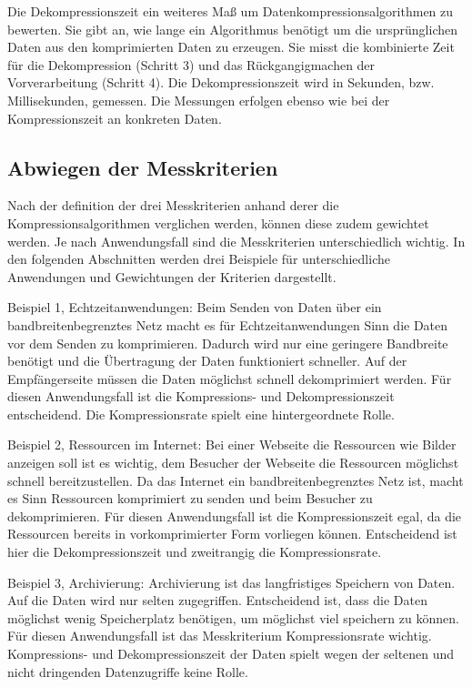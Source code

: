 \documentclass[conference]{IEEEtran}
\begin{document}
Die Dekompressionszeit ein weiteres Maß um Datenkompressionsalgorithmen zu bewerten.
Sie gibt an, wie lange ein Algorithmus benötigt um
die ursprünglichen Daten aus den komprimierten Daten zu erzeugen.
Sie misst die kombinierte Zeit für die Dekompression (Schritt 3) und das
Rückgangigmachen der Vorverarbeitung (Schritt 4).
Die Dekompressionszeit wird in Sekunden, bzw. Millisekunden, gemessen.
Die Messungen erfolgen ebenso wie bei der Kompressionszeit an konkreten Daten.

\subsection{Abwiegen der Messkriterien}

Nach der definition der drei Messkriterien anhand derer die
Kompressionsalgorithmen verglichen werden, können diese zudem gewichtet
werden.
Je nach Anwendungsfall sind die Messkriterien unterschiedlich wichtig.
In den folgenden Abschnitten werden drei Beispiele für unterschiedliche
Anwendungen und Gewichtungen der Kriterien dargestellt.

Beispiel 1, Echtzeitanwendungen:
Beim Senden von Daten über ein bandbreitenbegrenztes Netz macht es für
Echtzeitanwendungen Sinn die Daten vor dem Senden zu komprimieren.
Dadurch wird nur eine geringere Bandbreite benötigt und die Übertragung der
Daten funktioniert schneller.
Auf der Empfängerseite müssen die Daten möglichst schnell dekomprimiert werden.
Für diesen Anwendungsfall ist die Kompressions- und Dekompressionszeit entscheidend.
Die Kompressionsrate spielt eine hintergeordnete Rolle.

Beispiel 2, Ressourcen im Internet:
Bei einer Webseite die Ressourcen wie Bilder anzeigen soll ist es wichtig,
dem Besucher der Webseite die Ressourcen möglichst schnell bereitzustellen.
Da das Internet ein bandbreitenbegrenztes Netz ist, macht es Sinn Ressourcen komprimiert
zu senden und beim Besucher zu dekomprimieren.
Für diesen Anwendungsfall ist die Kompressionszeit egal, da die Ressourcen
bereits in vorkomprimierter Form vorliegen können.
Entscheidend ist hier die Dekompressionszeit und zweitrangig die Kompressionsrate.

Beispiel 3, Archivierung:
Archivierung ist das langfristiges Speichern von Daten.
Auf die Daten wird nur selten zugegriffen.
Entscheidend ist, dass die Daten möglichst wenig Speicherplatz benötigen,
um möglichst viel speichern zu können.
Für diesen Anwendungsfall ist das Messkriterium Kompressionsrate wichtig.
Kompressions- und Dekompressionszeit der Daten spielt wegen der seltenen und
nicht dringenden Datenzugriffe keine Rolle.
\end{document}
